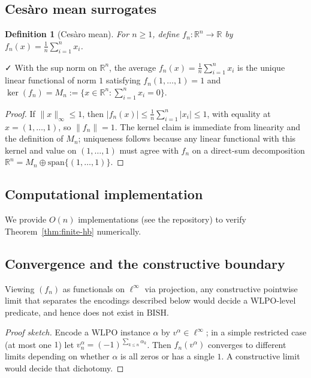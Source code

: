 \documentclass[11pt]{article}
\newtheorem{definition}[theorem]{Definition}
\newenvironment{defi}{\begin{definition}}{\end{definition}}
\newcommand{\leanok}{\textsf{\small \textcolor{green!70!black}{✓}}}
\newcommand{\R}{\mathbb{R}}
\newcommand{\linf}{\ell^\infty}
\newcommand{\WLPO}{\mathrm{WLPO}}
\newcommand{\BISH}{\mathrm{BISH}}
\begin{document}
\subsection{Ces\`aro mean surrogates}

\begin{defi}[Ces\`aro mean]
For $n\ge 1$, define $f_n:\R^n\to\R$ by $f_n(x)=\frac{1}{n}\sum_{i=1}^n x_i$.
\end{defi}

\begin{thm}\label{thm:finite-hb}\leanok
With the sup norm on $\R^n$, the average $f_n(x)=\frac{1}{n}\sum_{i=1}^n x_i$ is the unique linear functional of norm $1$ satisfying $f_n(1,\dots,1)=1$ and $\ker(f_n)=M_n:=\{x\in\R^n:\sum_{i=1}^n x_i=0\}$.
\end{thm}

\begin{proof}
If $\|x\|_\infty\le 1$, then $|f_n(x)|\le \frac{1}{n}\sum_{i=1}^n|x_i|\le 1$, with equality at $x=(1,\dots,1)$, so $\|f_n\|=1$. The kernel claim is immediate from linearity and the definition of $M_n$; uniqueness follows because any linear functional with this kernel and value on $(1,\dots,1)$ must agree with $f_n$ on a direct-sum decomposition $\R^n=M_n\oplus \mathrm{span}\{(1,\dots,1)\}$.
\end{proof}

\subsection{Computational implementation}

We provide $O(n)$ implementations (see the repository) to verify Theorem~\ref{thm:finite-hb} numerically.

\subsection{Convergence and the constructive boundary}

\begin{thm}
Viewing $(f_n)$ as functionals on $\linf$ via projection, any constructive pointwise limit that separates the encodings described below would decide a $\WLPO$-level predicate, and hence does not exist in $\BISH$.
\end{thm}

\begin{proof}[Proof sketch]
Encode a $\WLPO$ instance $\alpha$ by $v^\alpha\in\linf$; in a simple restricted case (at most one $1$) let $v^\alpha_n=(-1)^{\sum_{k\le n}\alpha_k}$. Then $f_n(v^\alpha)$ converges to different limits depending on whether $\alpha$ is all zeros or has a single $1$. A constructive limit would decide that dichotomy.
\end{proof}
\end{document}

